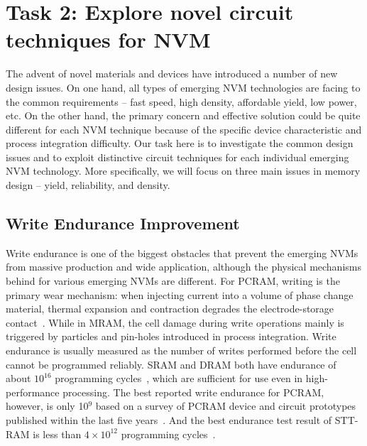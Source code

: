 
\section{Task 2: Explore novel circuit techniques for NVM}

The advent of novel materials and devices have introduced a number of new design issues. On one hand, all types of emerging NVM technologies are facing to the common requirements -- fast speed, high density, affordable yield, low power, etc. On the other hand, the primary concern and effective solution could be quite different for each NVM technique because of the specific device characteristic and process integration difficulty. Our task here is to investigate the common design issues and to exploit distinctive circuit techniques for each individual emerging NVM technology. More specifically, we will focus on three main issues in memory design -- yield, reliability, and density.

\subsection{Write Endurance Improvement}

Write endurance is one of the biggest obstacles that prevent the emerging NVMs from massive production and wide application, although the physical mechanisms behind for various emerging NVMs are different. For PCRAM, writing is the primary wear mechanism: when injecting current into a volume of phase change material, thermal expansion and contraction degrades the electrode-storage contact~\cite{Lee09}. While in MRAM, the cell damage during write operations mainly is triggered by particles and pin-holes introduced in process integration.  Write endurance is usually measured as the number of writes performed before the cell cannot be programmed reliably. SRAM and DRAM both have endurance of about $10^{16}$ programming cycles~\cite{ITRS07}, which are sufficient for use even in high-performance processing. The best reported write endurance for PCRAM, however, is only 10$^9$ based on a survey of PCRAM device and circuit prototypes published within the last five years~\cite{Lee09}. And the best endurance test result of STT-RAM is less than $4\times10^{12}$ programming cycles~\cite{Diao07}.

